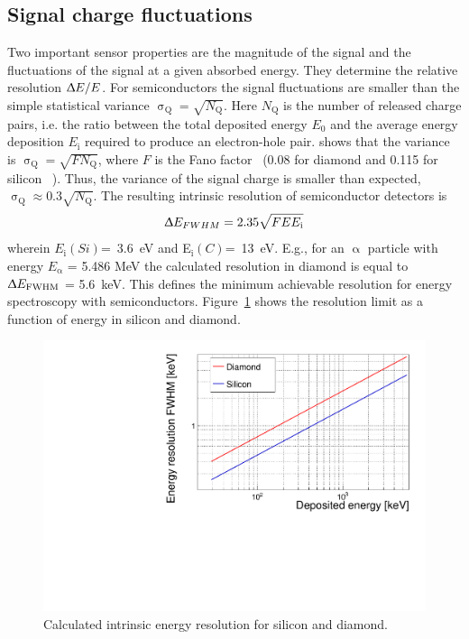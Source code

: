 \subsection{Signal charge fluctuations}
Two important sensor properties are the magnitude of the signal and the fluctuations of the signal at a given absorbed energy. They determine the relative resolution $\Updelta E/E$. For semiconductors the signal fluctuations are smaller than the simple statistical variance $\upsigma_\mathrm{Q}=\sqrt{N_\mathrm{Q}}$. Here $N_\mathrm{Q}$ is the number of released charge pairs, i.e. the ratio between the total deposited energy $E_\mathrm{0}$ and the average energy deposition $E_\mathrm{i}$ required to produce an electron-hole pair. \cite{} shows that the variance is $\upsigma_\mathrm{Q}=\sqrt{F N_\mathrm{Q}}$, where $F$ is the Fano factor~\cite{} (0.08 for diamond and 0.115 for silicon ~\cite{}). Thus, the variance of the signal charge is smaller than expected, $\upsigma_\mathrm{Q}\approx0.3 \sqrt{N_\mathrm{Q}}$. The resulting intrinsic resolution of semiconductor detectors is 
\begin{equation}
\label{eq:efwhm}
\Updelta E_{FWHM} = 2.35 \sqrt{FEE_\mathrm{i}} 
\end{equation} 
wherein $E_\mathrm{i}(Si)$=~3.6~eV and E$_\mathrm{i}(C)$=~13~eV. E.g., for an $\upalpha$ particle with energy $E_\upalpha$ = 5.486 MeV the calculated resolution in diamond is equal to $\Updelta E_{\mathrm{FWHM}}$ = 5.6~keV. This defines the minimum achievable resolution for energy spectroscopy with semiconductors. Figure~\ref{fig:enerres} shows the resolution limit as a function of energy in silicon and diamond.

\begin{figure}[!t]
\begin{center}
\includegraphics[width=0.8\linewidth]{../scripts/02_pulse_formation/plots/resolution}
\caption{Calculated intrinsic energy resolution for silicon and diamond.}
\label{fig:enerres}
\end{center}
\end{figure}




